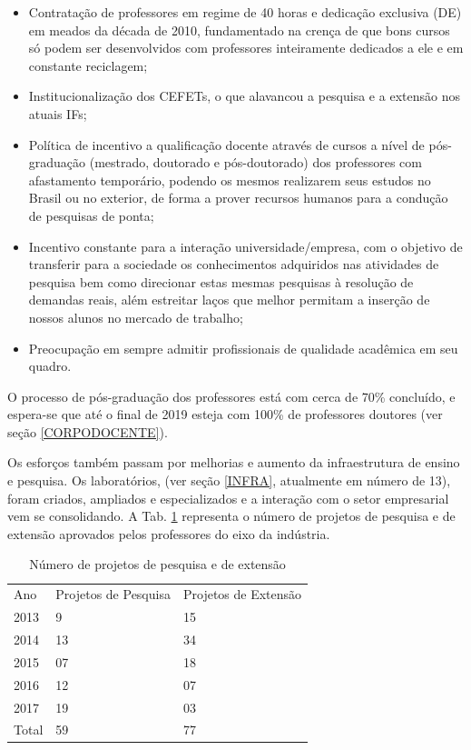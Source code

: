 \documentclass{paper}
\begin{document}
\begin{itemize}
\item Contratação de professores em regime de 40 horas e dedicação exclusiva (DE) em meados da década de 2010, fundamentado na crença de que bons cursos só podem ser desenvolvidos com professores inteiramente dedicados a ele e em constante reciclagem;

\item Institucionalização dos CEFETs, o que alavancou a pesquisa e a extensão nos atuais IFs;

\item Política de incentivo a qualificação docente através de cursos a nível de pós-graduação (mestrado, doutorado e pós-doutorado) dos professores com afastamento temporário, podendo os mesmos realizarem seus estudos no Brasil ou no exterior, de forma a prover recursos humanos para a condução de pesquisas de ponta;

\item Incentivo constante para a interação universidade/empresa, com o objetivo de transferir para a sociedade os conhecimentos adquiridos nas atividades de pesquisa bem como direcionar estas mesmas pesquisas à resolução de demandas reais, além estreitar laços que melhor permitam a inserção de nossos alunos no mercado de trabalho;

\item Preocupação em sempre admitir profissionais de qualidade acadêmica em seu quadro.
\end{itemize}
 
O processo de pós-graduação dos professores está com cerca de 70\% concluído, e espera-se que até o final de 2019 esteja com 100\% de professores doutores (ver seção \ref{CORPODOCENTE}).

Os esforços também passam por melhorias e aumento da infraestrutura de ensino e pesquisa. Os laboratórios, (ver seção \ref{INFRA}, atualmente em número de 13), foram criados, ampliados e especializados e a interação com o setor empresarial vem se consolidando. A Tab. \ref{tab11} representa o número de projetos de pesquisa e de extensão aprovados pelos professores do eixo da indústria. 

\begin{longtable}{|p{1.5cm}|p{4.5cm}|p{4.5cm}|}
    \caption{Número de projetos de pesquisa e de extensão}    \label{tab11} 
    \vspace{-0.25cm}
    \\ \hline 
    \cellcolor{\cinza} Ano & \cellcolor{\cinza}Projetos de Pesquisa & \cellcolor{\cinza}Projetos de Extensão  \\ 
    \hline
     2013 &  9  &  15 \\ \hline
     2014 &  13  &  34 \\ \hline
     2015 &  07  &  18 \\ \hline
     2016 &  12  &  07 \\ \hline
     2017 &  19  &  03 \\ \hline
     Total &  59  & 77 \\ \hline
   \end{longtable}
\end{document}
